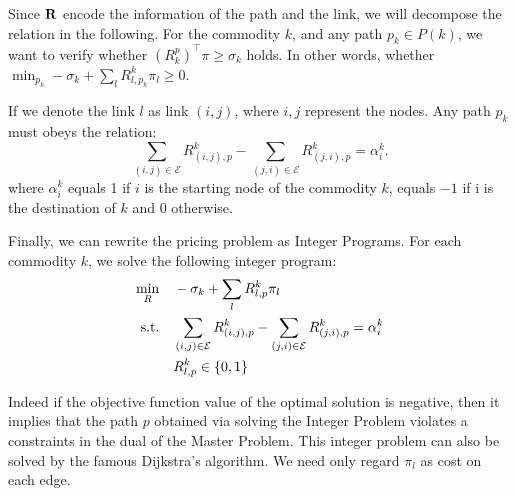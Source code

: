Since $\mathbf{R}$ encode the information of the path and the link, we will decompose the relation in the following. For the commodity $k$, and any path $p_k\in P(k)$, we want to verify whether $(R_k^p)^\top \pi \geq \sigma_k$ holds. In other words, whether $\min_{p_k} -\sigma_k+\sum_l R_{l,p_k}^k \pi_l\geq 0$.

If we denote the link $l$ as link $(i,j)$, where $i,j$ represent the nodes. Any path $p_k$ must obeys the relation:
\begin{equation}
\sum_{(i,j)\in \mathcal{E}} R_{(i,j),p}^k - \sum_{(j,i)\in \mathcal{E}} R_{(j,i),p}^k = \alpha_i^k.
\end{equation}
where $\alpha_i^k$ equals 1 if $i$ is the starting node of the commodity $k$, equals $-1$ if i is the
destination of $k$ and $0$ otherwise. 

Finally, we can rewrite the pricing problem as Integer Programs. For each commodity $k$, we solve the following integer program:
\begin{equation}
    \begin{split}
    \min_{R}&\quad -\sigma_k+\sum_l R_{l,p}^k \pi_l\\
    {\rm s.t.}&\quad \sum_{(i,j)\in \mathcal{E}} R_{(i,j),p}^k - \sum_{(j,i)\in \mathcal{E}} R_{(j,i),p}^k = \alpha_i^k\\
    &\quad R_{l,p}^k  \in \{0,1\}
    \end{split}
\end{equation}

Indeed if the objective function value of the optimal solution is negative, then it implies that the path $p$ obtained via solving the Integer Problem violates a constraints in the dual of the Master Problem. This integer problem can also be solved by the famous Dijkstra’s algorithm. We need only regard $\pi_l$ as cost on each edge.